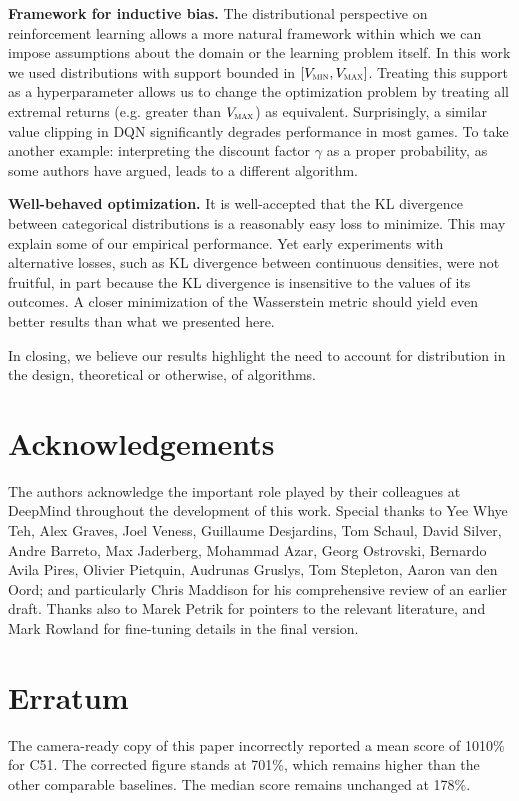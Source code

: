\documentclass{article}
\def \Vmax {V_{\textsc{max}}}
\def \Vmin {V_{\textsc{min}}}
\begin{document}
\textbf{Framework for inductive bias.} The distributional perspective on reinforcement learning allows a more natural framework within which we can impose assumptions about the domain or the learning problem itself. In this work we used distributions with support bounded in $[\Vmin, \Vmax]$. Treating this support as a hyperparameter allows us to change the optimization problem by treating all extremal returns (e.g. greater than $\Vmax$) as equivalent.
%
Surprisingly, a similar value clipping in DQN significantly degrades performance in most games.
To take another example: interpreting the discount factor $\gamma$ as a proper probability, as some authors have argued, leads to a different algorithm.

\textbf{Well-behaved optimization.} It is well-accepted that the KL divergence between categorical distributions is a reasonably easy loss to minimize. This may explain some of our empirical performance. Yet early experiments with alternative losses, such as KL divergence between continuous densities, were not fruitful, in part because the KL divergence is insensitive to the values of its outcomes. A closer minimization of the Wasserstein metric should yield even better results than what we presented here.

In closing, we believe our results highlight the need to account for distribution in the design, theoretical or otherwise, of algorithms. 

\section*{Acknowledgements}

The authors acknowledge the important role played by their colleagues at DeepMind throughout the development of this work. Special thanks to Yee Whye Teh, Alex Graves, Joel Veness, Guillaume Desjardins, Tom Schaul, David Silver, Andre Barreto, Max Jaderberg, Mohammad Azar, Georg Ostrovski, Bernardo Avila Pires, Olivier Pietquin, Audrunas Gruslys, Tom Stepleton, Aaron van den Oord; and particularly Chris Maddison for his comprehensive review of an earlier draft. Thanks also to Marek Petrik for pointers to the relevant literature, and Mark Rowland for fine-tuning details in the final version.

\section*{Erratum}
The camera-ready copy of this paper incorrectly reported a mean score of 1010\% for C51. The corrected figure stands at 701\%, which remains higher than the other comparable baselines. The median score remains unchanged at 178\%. 
\end{document}
